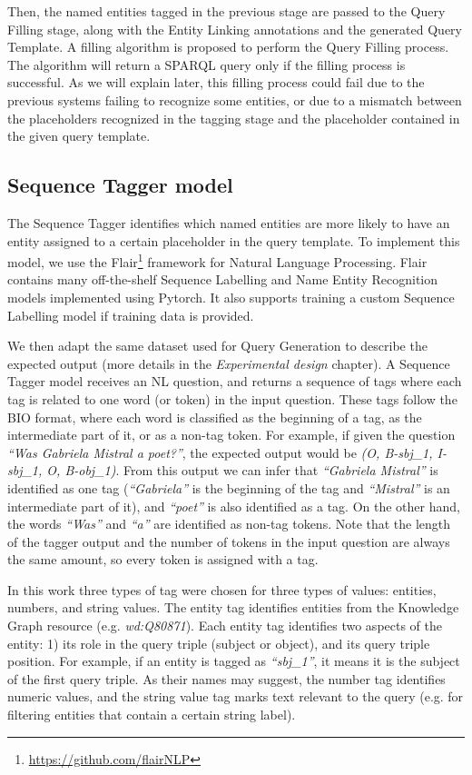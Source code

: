 Then, the named entities tagged in the previous stage are passed to the Query Filling stage, 
along with the Entity Linking annotations and the generated Query Template. A filling 
algorithm is proposed to perform the Query Filling process. The algorithm will return a 
SPARQL query only if the filling process is successful. As we will explain later, this filling 
process could fail due to the previous systems failing to recognize some entities, or due to 
a mismatch between the placeholders recognized in the tagging stage and the placeholder 
contained in the given query template.

\subsection{Sequence Tagger model}
\label{cap3:system/slotFillModule/seqTagger}
The Sequence Tagger identifies which named entities are more likely to have an entity 
assigned to a certain placeholder in the query template. To implement this model, we use the 
Flair\footnote{\url{https://github.com/flairNLP}} framework for Natural Language Processing. Flair 
contains many off-the-shelf Sequence Labelling and Name Entity Recognition models implemented 
using Pytorch. It also supports  training a custom Sequence Labelling model if training data 
is provided.

We then adapt the same dataset used for Query Generation to describe the expected output (more 
details in the \textit{Experimental design} chapter). A Sequence Tagger model receives an NL 
question, and returns a sequence of tags where each tag is related to one word (or token) in 
the input question. These tags follow the BIO format, where each word is classified as the 
beginning of a tag, as the intermediate part of it, or as a non-tag token. For example, if 
given the question \textit{“Was Gabriela Mistral a poet?”}, the expected output would be 
\textit{(O, B-sbj\_1, I-sbj\_1, O, B-obj\_1)}. From this output we can infer that \textit{“Gabriela 
Mistral”} is identified as one tag (\textit{“Gabriela”} is the beginning of the tag and 
\textit{“Mistral”} is an intermediate part of it), and \textit{“poet”} is also identified as 
a tag. On the other hand, the words \textit{“Was”} and \textit{“a”} are identified as non-tag 
tokens. Note that the length of the tagger output and the number of tokens in the input 
question are always the same amount, so every token is assigned with a tag.

In this work three types of tag were chosen for three types of values: entities, numbers, and 
string values. The entity tag identifies entities from the Knowledge Graph resource (e.g. 
\textit{wd:Q80871}). Each entity tag identifies two aspects of the entity: 1) its role in the 
query triple (subject or object), and its query triple position. For example, if an entity is 
tagged as \textit{“sbj\_1”}, it means it is the subject of the first query triple. As their 
names may suggest, the number tag identifies numeric values, and the string value tag marks 
text relevant to the query (e.g. for filtering entities that contain a certain string label).

